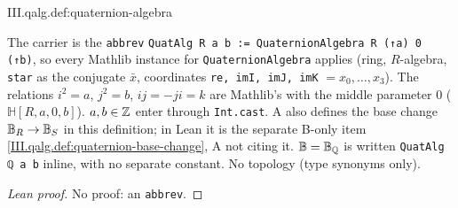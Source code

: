 \begin{definition}
\end{definition}
\begin{tfformal}{III.qalg.def:quaternion-algebra}
\begin{tffidelity}
The carrier is the \texttt{abbrev} \texttt{QuatAlg R a b := QuaternionAlgebra R (↑a) 0 (↑b)}, so every Mathlib instance for \texttt{QuaternionAlgebra} applies (ring, $R$-algebra, \texttt{star} as the conjugate $\bar x$, coordinates \texttt{re, imI, imJ, imK} $=x_0,\dots,x_3$). The relations $i^2=a$, $j^2=b$, $ij=-ji=k$ are Mathlib's with the middle parameter $0$ ($\mathbb H[R,a,0,b]$). $a,b\in\mathbb{Z}$ enter through \texttt{Int.cast}. A also defines the base change $\mathbb{B}_R\to\mathbb{B}_S$ in this definition; in Lean it is the separate B-only item \cref{III.qalg.def:quaternion-base-change}, A not citing it. $\mathbb{B}=\mathbb{B}_{\mathbb{Q}}$ is written \texttt{QuatAlg ℚ a b} inline, with no separate constant. No topology (type synonyms only).
\end{tffidelity}
\end{tfformal}
\begin{proof}[Lean proof]
No proof: an \texttt{abbrev}.
\end{proof}


